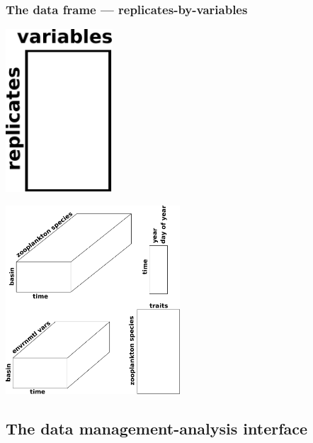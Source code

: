 \documentclass{beamer}
\numberwithin{exercise}{section}
\begin{document}
\begin{frame}
\frametitle{The data frame --- replicates-by-variables}
\begin{center}
\includegraphics[width=4cm]{dataframe}
\end{center}
\end{frame}

\begin{frame}
\begin{center}
\includegraphics[width=6.5cm]{BeatrixTableCartoon}
\end{center}
\end{frame}

\subsection[Data management]{The data management-analysis interface}
\end{document}
